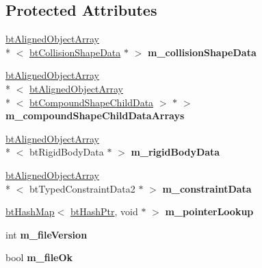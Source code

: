 \subsection*{Protected Attributes}
\begin{DoxyCompactItemize}
\item 
\hypertarget{classbt_bullet_xml_world_importer_a4e50161ae1686605a46f4cb90d73f07b}{\hyperlink{classbt_aligned_object_array}{bt\+Aligned\+Object\+Array}\\*
$<$ \hyperlink{structbt_collision_shape_data}{bt\+Collision\+Shape\+Data} $\ast$ $>$ {\bfseries m\+\_\+collision\+Shape\+Data}}\label{classbt_bullet_xml_world_importer_a4e50161ae1686605a46f4cb90d73f07b}

\item 
\hypertarget{classbt_bullet_xml_world_importer_a0a0777213bab0ef6d934e54f7ca1792a}{\hyperlink{classbt_aligned_object_array}{bt\+Aligned\+Object\+Array}\\*
$<$ \hyperlink{classbt_aligned_object_array}{bt\+Aligned\+Object\+Array}\\*
$<$ \hyperlink{structbt_compound_shape_child_data}{bt\+Compound\+Shape\+Child\+Data} $>$ $\ast$ $>$ {\bfseries m\+\_\+compound\+Shape\+Child\+Data\+Arrays}}\label{classbt_bullet_xml_world_importer_a0a0777213bab0ef6d934e54f7ca1792a}

\item 
\hypertarget{classbt_bullet_xml_world_importer_a2d376dfafdc3581c37202cfa3b6097f2}{\hyperlink{classbt_aligned_object_array}{bt\+Aligned\+Object\+Array}\\*
$<$ bt\+Rigid\+Body\+Data $\ast$ $>$ {\bfseries m\+\_\+rigid\+Body\+Data}}\label{classbt_bullet_xml_world_importer_a2d376dfafdc3581c37202cfa3b6097f2}

\item 
\hypertarget{classbt_bullet_xml_world_importer_a33dba0fbfb72b68625102331aafd4fd4}{\hyperlink{classbt_aligned_object_array}{bt\+Aligned\+Object\+Array}\\*
$<$ bt\+Typed\+Constraint\+Data2 $\ast$ $>$ {\bfseries m\+\_\+constraint\+Data}}\label{classbt_bullet_xml_world_importer_a33dba0fbfb72b68625102331aafd4fd4}

\item 
\hypertarget{classbt_bullet_xml_world_importer_ae1cc01ad0e114c7dd2d945e53ed96c34}{\hyperlink{classbt_hash_map}{bt\+Hash\+Map}$<$ \hyperlink{classbt_hash_ptr}{bt\+Hash\+Ptr}, void $\ast$ $>$ {\bfseries m\+\_\+pointer\+Lookup}}\label{classbt_bullet_xml_world_importer_ae1cc01ad0e114c7dd2d945e53ed96c34}

\item 
\hypertarget{classbt_bullet_xml_world_importer_a5e4f3d50d3432246b879aaf1ab188771}{int {\bfseries m\+\_\+file\+Version}}\label{classbt_bullet_xml_world_importer_a5e4f3d50d3432246b879aaf1ab188771}

\item 
\hypertarget{classbt_bullet_xml_world_importer_ae28a4dcc056f9639b45a17dd81dac711}{bool {\bfseries m\+\_\+file\+Ok}}\label{classbt_bullet_xml_world_importer_ae28a4dcc056f9639b45a17dd81dac711}

\end{DoxyCompactItemize}
